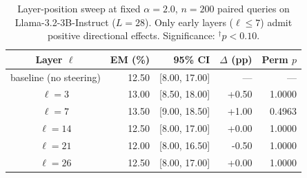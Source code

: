 \begin{table}[htbp]
\caption{Layer-position sweep at fixed $\alpha\!=\!2.0$, $n\!=\!200$ paired queries on Llama-3.2-3B-Instruct ($L\!=\!28$). Only early layers ($\ell\!\leq\!7$) admit positive directional effects. Significance: $^{\dagger}p<0.10$.}
\label{tab:layer-sweep}
\centering\renewcommand{\arraystretch}{1.15}
\begin{tabular}{c r r r r}
\toprule
Layer $\ell$ & EM (\%) & 95\% CI & $\Delta$ (pp) & Perm $p$ \\
\midrule
baseline (no steering) & 12.50 & [8.00, 17.00] & --- & --- \\
$\ell=3$ & 13.00 & [8.50, 18.00] & +0.50 & 1.0000 \\
$\ell=7$ & 13.50 & [9.00, 18.50] & +1.00 & 0.4963 \\
$\ell=14$ & 12.50 & [8.00, 17.00] & +0.00 & 1.0000 \\
$\ell=21$ & 12.00 & [8.00, 16.50] & -0.50 & 1.0000 \\
$\ell=26$ & 12.50 & [8.00, 17.00] & +0.00 & 1.0000 \\
\bottomrule\end{tabular}\end{table}
